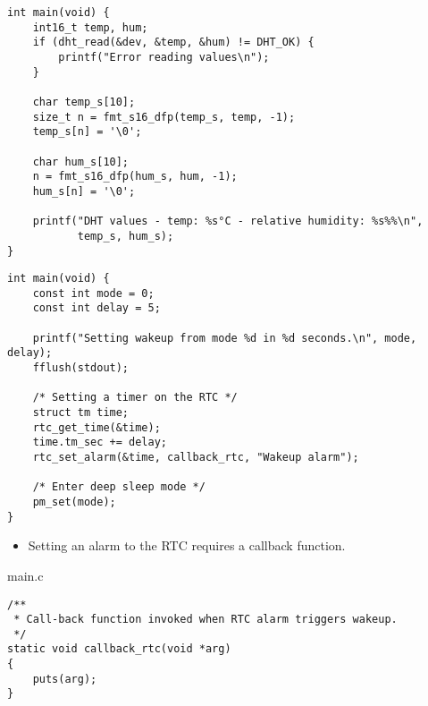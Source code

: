 \documentclass[aspectratio=169]{beamer}
\begin{document}
\begin{frame}[fragile]{}

\begin{exampleblock}{}
\begin{verbatim}
int main(void) {
    int16_t temp, hum;
    if (dht_read(&dev, &temp, &hum) != DHT_OK) {
        printf("Error reading values\n");
    }
    
    char temp_s[10];
    size_t n = fmt_s16_dfp(temp_s, temp, -1);
    temp_s[n] = '\0';
    
    char hum_s[10];
    n = fmt_s16_dfp(hum_s, hum, -1);
    hum_s[n] = '\0';        

    printf("DHT values - temp: %s°C - relative humidity: %s%%\n",
           temp_s, hum_s);
}
\end{verbatim}
\end{exampleblock}
\vspace{2cm}
\end{frame}

\begin{frame}[fragile]{}

\begin{exampleblock}{}
\begin{verbatim}
int main(void) {
    const int mode = 0;
    const int delay = 5;

    printf("Setting wakeup from mode %d in %d seconds.\n", mode, delay);
    fflush(stdout);

    /* Setting a timer on the RTC */
    struct tm time;
    rtc_get_time(&time);
    time.tm_sec += delay;
    rtc_set_alarm(&time, callback_rtc, "Wakeup alarm");

    /* Enter deep sleep mode */
    pm_set(mode); 
}
\end{verbatim}
\end{exampleblock}
\vspace{2cm}
\end{frame}



\begin{frame}[fragile]{}
\begin{itemize}

\item Setting an alarm to the RTC requires a callback function.

\end{itemize}

\vspace{.5cm}

\begin{exampleblock}{main.c}
\begin{verbatim}
/**
 * Call-back function invoked when RTC alarm triggers wakeup.
 */
static void callback_rtc(void *arg)
{
    puts(arg);
}
\end{verbatim}
\end{exampleblock}

\vspace{2cm}
\end{frame}
\end{document}
